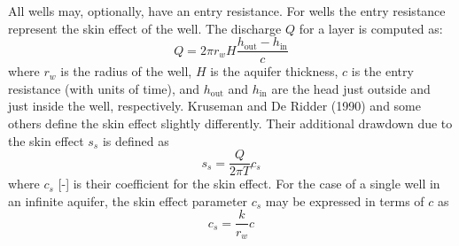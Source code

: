 \documentclass [10pt,letterpaper] {article}
\begin{document}
All wells  may, optionally, have an entry resistance. For wells the entry resistance represent the skin effect of the well. The discharge $Q$ for a layer is computed as:
\begin{equation}
Q = 2\pi r_w H \frac{h_\text{out}-h_\text{in}}{c}
\end{equation}
where $r_w$ is the radius of the well, $H$ is the aquifer thickness, $c$ is the entry resistance (with units of time), and $h_\text{out}$ and $h_\text{in}$ are the head just outside and just inside the well, respectively.
Kruseman and De Ridder (1990) and some others define the skin effect slightly differently. Their additional drawdown due to the skin effect $s_s$ is defined as
\begin{equation}
s_s = \frac{Q}{2\pi T}c_s
\end{equation}
where $c_s$ [-] is their coefficient for the skin effect. For the case of a single well in an infinite aquifer, the skin effect parameter $c_s$ may be expressed in terms of $c$ as
\begin{equation}
c_s = \frac{k}{r_w}c
\end{equation}
\end{document}
